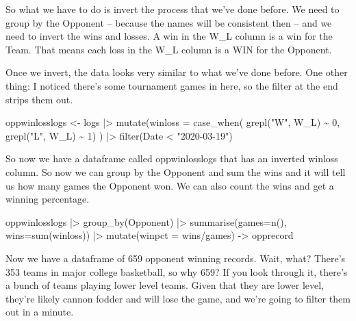 \documentclass[
  letterpaper,
  DIV=11,
  numbers=noendperiod]{scrreprt}
\newenvironment{Shaded}{\begin{snugshade}}{\end{snugshade}}
\newcommand{\AttributeTok}[1]{\textcolor[rgb]{0.40,0.45,0.13}{#1}}
\newcommand{\DecValTok}[1]{\textcolor[rgb]{0.68,0.00,0.00}{#1}}
\newcommand{\FunctionTok}[1]{\textcolor[rgb]{0.28,0.35,0.67}{#1}}
\newcommand{\NormalTok}[1]{\textcolor[rgb]{0.00,0.23,0.31}{#1}}
\newcommand{\OtherTok}[1]{\textcolor[rgb]{0.00,0.23,0.31}{#1}}
\newcommand{\SpecialCharTok}[1]{\textcolor[rgb]{0.37,0.37,0.37}{#1}}
\newcommand{\StringTok}[1]{\textcolor[rgb]{0.13,0.47,0.30}{#1}}
\begin{document}
So what we have to do is invert the process that we've done before. We
need to group by the Opponent -- because the names will be consistent
then -- and we need to invert the wins and losses. A win in the W\_L
column is a win for the Team. That means each loss in the W\_L column is
a WIN for the Opponent.

Once we invert, the data looks very similar to what we've done before.
One other thing: I noticed there's some tournament games in here, so the
filter at the end strips them out.

\begin{Shaded}
\begin{Highlighting}[]
\NormalTok{oppwinlosslogs }\OtherTok{\textless{}{-}}\NormalTok{ logs }\SpecialCharTok{|\textgreater{}} 
  \FunctionTok{mutate}\NormalTok{(}\AttributeTok{winloss =} \FunctionTok{case\_when}\NormalTok{(}
    \FunctionTok{grepl}\NormalTok{(}\StringTok{"W"}\NormalTok{, W\_L) }\SpecialCharTok{\textasciitilde{}} \DecValTok{0}\NormalTok{, }
    \FunctionTok{grepl}\NormalTok{(}\StringTok{"L"}\NormalTok{, W\_L) }\SpecialCharTok{\textasciitilde{}} \DecValTok{1}\NormalTok{)}
\NormalTok{) }\SpecialCharTok{|\textgreater{}} 
  \FunctionTok{filter}\NormalTok{(Date }\SpecialCharTok{\textless{}} \StringTok{"2020{-}03{-}19"}\NormalTok{)}
\end{Highlighting}
\end{Shaded}

So now we have a dataframe called oppwinlosslogs that has an inverted
winloss column. So now we can group by the Opponent and sum the wins and
it will tell us how many games the Opponent won. We can also count the
wins and get a winning percentage.

\begin{Shaded}
\begin{Highlighting}[]
\NormalTok{oppwinlosslogs }\SpecialCharTok{|\textgreater{}} 
  \FunctionTok{group\_by}\NormalTok{(Opponent) }\SpecialCharTok{|\textgreater{}} 
  \FunctionTok{summarise}\NormalTok{(}\AttributeTok{games=}\FunctionTok{n}\NormalTok{(), }\AttributeTok{wins=}\FunctionTok{sum}\NormalTok{(winloss)) }\SpecialCharTok{|\textgreater{}} 
  \FunctionTok{mutate}\NormalTok{(}\AttributeTok{winpct =}\NormalTok{ wins}\SpecialCharTok{/}\NormalTok{games) }\OtherTok{{-}\textgreater{}}\NormalTok{ opprecord}
\end{Highlighting}
\end{Shaded}

Now we have a dataframe of 659 opponent winning records. Wait, what?
There's 353 teams in major college basketball, so why 659? If you look
through it, there's a bunch of teams playing lower level teams. Given
that they are lower level, they're likely cannon fodder and will lose
the game, and we're going to filter them out in a minute.
\end{document}
